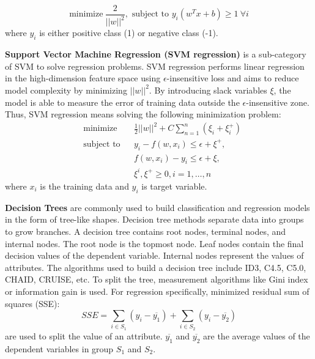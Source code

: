 \documentclass[12pt,english]{report}
\begin{document}
\begin{equation}
\text{minimize} \ \frac{2}{||w||^2},
\text{ subject to }
y_{i}(w^T x +b) \geq 1 \ \forall i
\end{equation}
where $y_i$ is either positive class (1) or negative class (-1).

\vspace{0.15in}
\noindent \textbf{Support Vector Machine Regression (SVM regression)} is a sub-category of SVM to solve regression problems.  SVM regression performs linear regression in the high-dimension feature space using  $\epsilon$-insensitive loss and aims to reduce model complexity by minimizing $||w||^2$. By introducing slack variables $\xi$, the model is able to measure the error of training data outside the $\epsilon$-insensitive zone.
Thus,  SVM regression means solving the following minimization problem: 
\begin{equation}
    \begin{aligned}
     &   \text{minimize}
     & & \frac{1}{2} {||w||^2} + C \sum_{n=1}^{n}(\xi_i + \xi_i^+) \\
     & \text{subject to} 
     & & y_{i} - f(w,x_i) \leq  \epsilon + \xi^+, \\
     &&& f(w,x_i) - y_{i} \leq \epsilon + \xi, \\
     &&& \xi^i, \xi^+ \geq 0, i=1,\dots,n
    \end{aligned}
\end{equation}
where  $x_i$ is the training data and $y_i$ is target variable.
% 
% 

\vspace{0.15in}
\noindent \textbf{Decision Trees} are commonly used to build classification and regression models in the form of tree-like  shapes. Decision tree methods separate data into groups to grow branches. A decision tree contains root nodes, terminal nodes, and internal nodes. The root node is the topmost node. Leaf nodes contain the final decision values of the dependent variable. Internal nodes represent the values of attributes. The algorithms used to build a decision tree include ID3, C4.5, C5.0, CHAID, CRUISE, etc. To split the tree, measurement algorithms like Gini index or information gain is used. For regression specifically, minimized  residual sum of squares (SSE):
% 
% 
\begin{equation}
    SSE = \sum_{i \in S_1} (y_i - \overline{y_1}) + \sum_{i \in S_2} (y_i - \overline{y_2})
\end{equation}
are used to split the value of an attribute. $\overline{y_1}$ and $\overline{y_2}$ are the average values of the dependent variables in group $S_1$ and $S_2$. 
\end{document}
